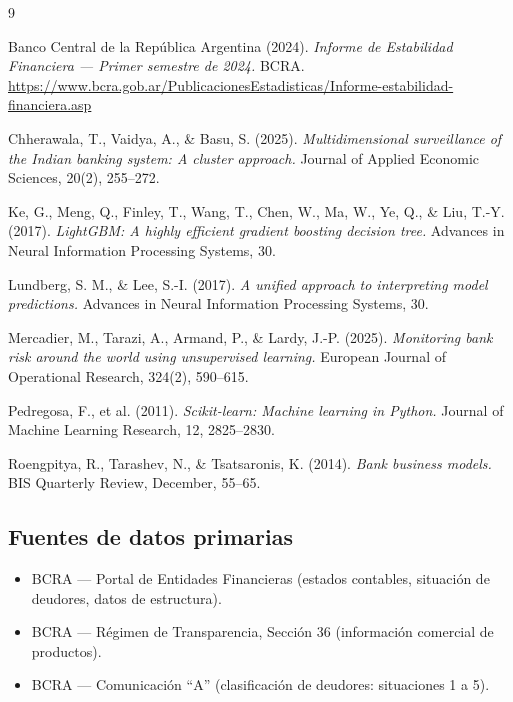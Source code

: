 \documentclass[11pt,a4paper]{article}
\begin{document}
\begingroup
\renewcommand{\section}[2]{}
\begin{thebibliography}{9}

Banco Central de la República Argentina (2024). \textit{Informe de Estabilidad Financiera --- Primer
semestre de 2024.} BCRA. \url{https://www.bcra.gob.ar/PublicacionesEstadisticas/Informe-estabilidad-financiera.asp}

Chherawala, T., Vaidya, A., \& Basu, S. (2025). \textit{Multidimensional surveillance of the Indian banking
system: A cluster approach.} Journal of Applied Economic Sciences, 20(2), 255--272.

Ke, G., Meng, Q., Finley, T., Wang, T., Chen, W., Ma, W., Ye, Q., \& Liu, T.-Y. (2017). \textit{LightGBM: A
highly efficient gradient boosting decision tree.} Advances in Neural Information Processing Systems, 30.

Lundberg, S. M., \& Lee, S.-I. (2017). \textit{A unified approach to interpreting model predictions.} Advances
in Neural Information Processing Systems, 30.

Mercadier, M., Tarazi, A., Armand, P., \& Lardy, J.-P. (2025). \textit{Monitoring bank risk around the world
using unsupervised learning.} European Journal of Operational Research, 324(2), 590--615.

Pedregosa, F., et al. (2011). \textit{Scikit-learn: Machine learning in Python.} Journal of Machine Learning
Research, 12, 2825--2830.

Roengpitya, R., Tarashev, N., \& Tsatsaronis, K. (2014). \textit{Bank business models.} BIS Quarterly Review,
December, 55--65.

\end{thebibliography}
\endgroup

\subsection{Fuentes de datos primarias}

\begin{itemize}
  \item BCRA --- Portal de Entidades Financieras (estados contables, situación de deudores, datos de estructura).
  \item BCRA --- Régimen de Transparencia, Sección 36 (información comercial de productos).
  \item BCRA --- Comunicación ``A'' (clasificación de deudores: situaciones 1 a 5).
\end{itemize}
\end{document}
